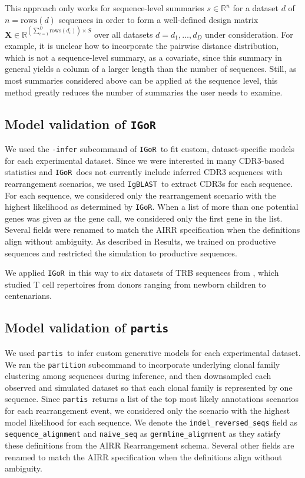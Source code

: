 \documentclass{article}
\newcommand{\partis}{\texttt{partis}}
\newcommand{\igor}{\texttt{IGoR}}
\newcommand{\igblast}{\texttt{IgBLAST}}
\begin{document}
This approach only works for sequence-level summaries $s \in \mathbb{R}^n$ for a dataset $d$ of $n = \text{rows}(d)$ sequences in order to form a well-defined design matrix $\mathbf X \in \mathbb{R}^{\left(\sum_{i=1}^D \text{rows}(d_i) \right) \times S}$ over all datasets $d = d_1, \dotsc, d_D$ under consideration.
For example, it is unclear how to incorporate the pairwise distance distribution, which is not a sequence-level summary, as a covariate, since this summary in general yields a column of a larger length than the number of sequences.
Still, as most summaries considered above can be applied at the sequence level, this method greatly reduces the number of summaries the user needs to examine.

\subsection*{Model validation of \igor}
We used the \texttt{-infer} subcommand of \igor\ to fit custom, dataset-specific models for each experimental dataset.
Since we were interested in many CDR3-based statistics and \igor\ does not currently include inferred CDR3 sequences with rearrangement scenarios, we used \igblast\ to extract CDR3s for each sequence.
For each sequence, we considered only the rearrangement scenario with the highest likelihood as determined by \igor.
When a list of more than one potential genes was given as the gene call, we considered only the first gene in the list.
Several fields were renamed to match the AIRR specification when the definitions align without ambiguity.
As described in Results, we trained on productive sequences and restricted the simulation to productive sequences.

We applied \igor\ in this way to six datasets of TRB sequences from \cite{Britanova2016-iw}, which studied T cell repertoires from donors ranging from newborn children to centenarians.

\subsection*{Model validation of \partis}

We used \partis\ to infer custom generative models for each experimental dataset.
We ran the \texttt{partition} subcommand to incorporate underlying clonal family clustering among sequences during inference, and then downsampled each observed and simulated dataset so that each clonal family is represented by one sequence.
Since \partis\ returns a list of the top most likely annotations scenarios for each rearrangement event, we considered only the scenario with the highest model likelihood for each sequence.
We denote the \texttt{indel\_reversed\_seqs} field as \texttt{sequence\_alignment} and \texttt{naive\_seq} as \texttt{germline\_alignment} as they satisfy these definitions from the AIRR Rearrangement schema.
Several other fields are renamed to match the AIRR specification when the definitions align without ambiguity.
\end{document}

